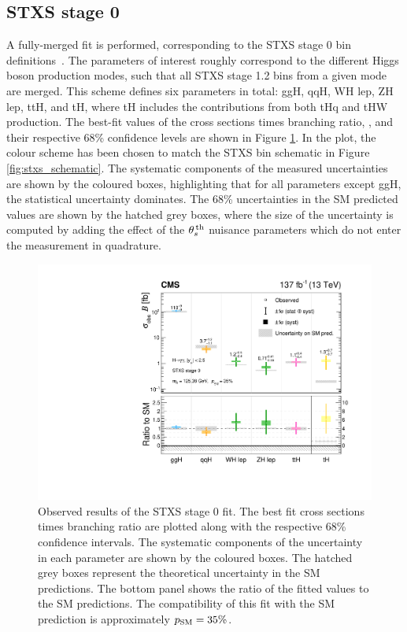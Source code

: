 \subsection{STXS stage 0}
A fully-merged fit is performed, corresponding to the STXS stage 0 bin definitions~\cite{deFlorian:2016spz}. The parameters of interest roughly correspond to the different Higgs boson production modes, such that all STXS stage 1.2 bins from a given mode are merged. This scheme defines six parameters in total: ggH, qqH, WH lep, ZH lep, ttH, and tH, where tH includes the contributions from both tHq and tHW production. The best-fit values of the cross sections times branching ratio, \xsbr, and their respective 68\% confidence levels are shown in Figure \ref{fig:stage0_results}. In the plot, the colour scheme has been chosen to match the STXS bin schematic in Figure \ref{fig:stxs_schematic}. The systematic components of the measured uncertainties are shown by the coloured boxes, highlighting that for all parameters except ggH, the statistical uncertainty dominates. The 68\% uncertainties in the SM predicted values are shown by the hatched grey boxes, where the size of the uncertainty is computed by adding the effect of the $\theta^{\,\rm{th}}_{s}$ nuisance parameters which do not enter the measurement in quadrature.

\begin{figure}[htbp]
  \centering
  \includegraphics[width=.6\textwidth]{Figures/hgg_results/stage0_summary.pdf}
  \caption[Results of the STXS stage 0 fit]
  {
    Observed results of the STXS stage 0 fit. The best fit cross sections times branching ratio are plotted along with the respective 68\% confidence intervals. The systematic components of the uncertainty in each parameter are shown by the coloured boxes. The hatched grey boxes represent the theoretical uncertainty in the SM predictions. The bottom panel shows the ratio of the fitted values to the SM predictions. The compatibility of this fit with the SM prediction is approximately $p_{\rm{SM}}=35\%$. 
  }
  \label{fig:stage0_results}
\end{figure}

